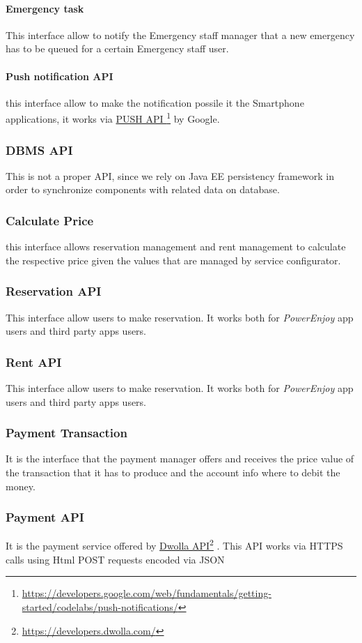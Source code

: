 \documentclass[english]{article}
\newcommand\fnurl[2]{%
	\href{#2}{#1}\footnote{\url{#2}}%
}
\newcommand{\powerenjoy}{\textit{PowerEnjoy }}
\begin{document}
		\paragraph{Emergency task}
		This interface allow to notify the Emergency staff manager that a new emergency has to be queued for a certain Emergency staff user.
		\paragraph{Push notification API}
		this interface allow to make the notification possile it the Smartphone applications, it works via \fnurl{PUSH API }{https://developers.google.com/web/fundamentals/getting-started/codelabs/push-notifications/}by Google.
	\subsubsection*{DBMS API}
	This is not a proper API, since we rely on Java EE persistency framework in order to synchronize components with related data on database.
	\subsubsection*{Calculate Price}
	this interface allows reservation management and rent management to calculate the respective price given the values that are managed by service configurator.	
	\subsubsection*{Reservation API}
	This interface allow users to make reservation. It works both for \powerenjoy app users and third party apps users.	
	\subsubsection*{Rent API}
	This interface allow users to make reservation. It works both for \powerenjoy app users and third party apps users.
	\subsubsection*{Payment Transaction}
	It is the interface that the payment manager offers and receives the price value of the transaction that it has to produce and the account info where to debit the money.
	\subsubsection*{Payment API}
	It is the payment service offered by \fnurl{Dwolla API}{https://developers.dwolla.com/}. This API works via HTTPS calls using Html POST requests encoded via JSON
\end{document}

